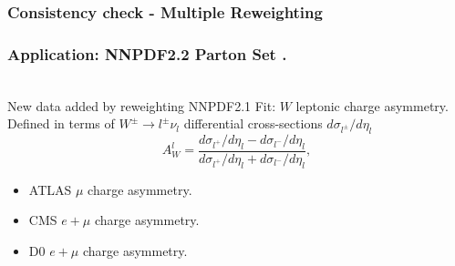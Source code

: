 \documentclass[10pt]{beamer}
\newcommand{\be}{\begin{equation*}}
\newcommand{\ee}{\end{equation*}}
\newcommand{\vso}{\vskip15pt}
\begin{document}
\begin{frame}
\frametitle{Consistency check - Multiple Reweighting}
\begin{figure}
\end{figure}
\end{frame}

\begin{frame}
\frametitle{Application: NNPDF2.2 Parton Set .}
\\
New data added by reweighting NNPDF2.1 Fit: $W$ leptonic charge asymmetry.
\vso
Defined in terms of $W^{\pm}\to l^\pm\nu_l $ differential cross-sections $d\sigma_{l^\pm}/d\eta_l$
\be 
  A^l_W=\frac{d\sigma_{l^{+}}/d\eta_{l}-d\sigma_{l^{-}}/d\eta_{l}}
  {d\sigma_{l^{+}}/d\eta_{l}+d\sigma_{l^{-}}/d\eta_{l}}, 
\ee


\begin{itemize}
		\item<1-> ATLAS $\mu$ charge asymmetry. \hspace*{\fill {  \color{blue} [arXiv:1103.2929]}}
		\item<1-> CMS $e+\mu$ charge asymmetry. \hspace*{\fill { \color{blue}  [arXiv:1103.3470] }}
		\item<1-> D0 $e+\mu$ charge asymmetry. \hspace*{\fill { \color{blue} [arXiv:0709.4254]}}
\end{itemize}

\begin{figure}[htb]
  \begin{center}
  \end{center}
  \end{figure}

\end{frame}
\end{document}
